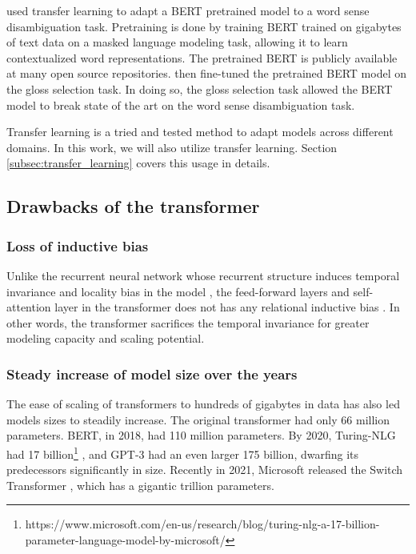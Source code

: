 \textcite{yap_adapting_2020} used transfer learning to adapt a BERT \cite{devlin_bert_2019} pretrained model to a word sense disambiguation task. Pretraining is done by training BERT trained on gigabytes of text data on a masked language modeling task, allowing it to learn contextualized word representations. The pretrained BERT is publicly available at many open source repositories. \textcite{yap_adapting_2020} then fine-tuned the pretrained BERT model on the gloss selection task. In doing so, the gloss selection task allowed the BERT model to break state of the art on the word sense disambiguation task. 

Transfer learning is a tried and tested method to adapt models across different domains. In this work, we will also utilize transfer learning. Section \ref{subsec:transfer_learning} covers this usage in details.

\subsection{Drawbacks of the transformer} \label{subsec:drawbacks_transformer}

\subsubsection{Loss of inductive bias} \label{subsubsec:drawback1_inductive_bias}
Unlike the recurrent neural network whose recurrent structure induces temporal invariance and locality bias in the model \cite{battaglia_relational_inductive_biases_2018}, the feed-forward layers and self-attention layer in the transformer does not has any relational inductive bias \cite{battaglia_relational_inductive_biases_2018}. In other words, the transformer sacrifices the temporal invariance for greater modeling capacity and scaling potential. 

\subsubsection{Steady increase of model size over the years} \label{subsubsec:drawback2_increasing model size}

The ease of scaling of transformers to hundreds of gigabytes in data has also led models sizes to steadily increase. The original transformer \cite{vaswani_attention_2017} had only 66 million parameters. BERT, in 2018, \cite{devlin_bert_2019} had 110 million parameters. By 2020, Turing-NLG had 17 billion\footnote{https://www.microsoft.com/en-us/research/blog/turing-nlg-a-17-billion-parameter-language-model-by-microsoft/} \cite{ganesh2020compressing_turingNLG_param_ref}, and GPT-3 \cite{brown_language_2020_gpt3} had an even larger 175 billion, dwarfing its predecessors significantly in size. Recently in 2021, Microsoft released the Switch Transformer \cite{fedus2021switch}, which has a gigantic trillion parameters.

